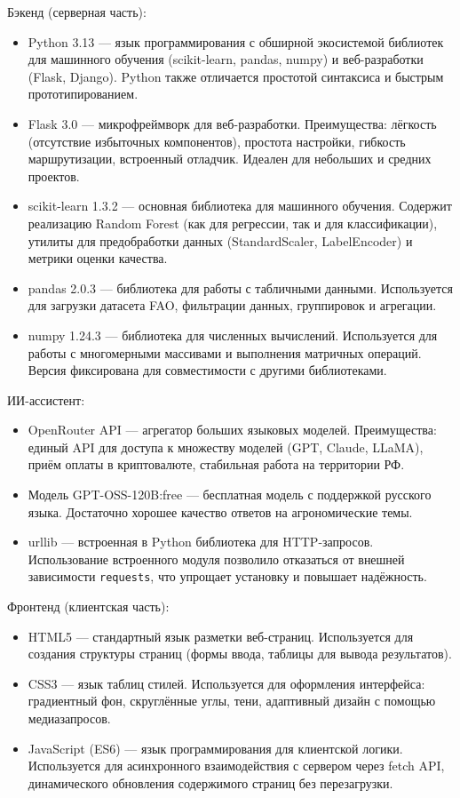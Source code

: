 \documentclass[14pt, a4paper]{extarticle}
\begin{document}
    Бэкенд (серверная часть):
    \begin{itemize}
        \item Python 3.13 — язык программирования с обширной экосистемой библиотек для машинного обучения (scikit-learn, pandas, numpy) и веб-разработки (Flask, Django). Python также отличается простотой синтаксиса и быстрым прототипированием.
        \item Flask 3.0 \cite{flask} — микрофреймворк для веб-разработки. Преимущества: лёгкость (отсутствие избыточных компонентов), простота настройки, гибкость маршрутизации, встроенный отладчик. Идеален для небольших и средних проектов.
        \item scikit-learn 1.3.2 \cite{sklearn} — основная библиотека для машинного обучения. Содержит реализацию Random Forest (как для регрессии, так и для классификации), утилиты для предобработки данных (StandardScaler, LabelEncoder) и метрики оценки качества.
        \item pandas 2.0.3 — библиотека для работы с табличными данными. Используется для загрузки датасета FAO, фильтрации данных, группировок и агрегации.
        \item numpy 1.24.3 — библиотека для численных вычислений. Используется для работы с многомерными массивами и выполнения матричных операций. Версия фиксирована для совместимости с другими библиотеками.
    \end{itemize}

    ИИ-ассистент:
    \begin{itemize}
        \item OpenRouter API \cite{openrouter} — агрегатор больших языковых моделей. Преимущества: единый API для доступа к множеству моделей (GPT, Claude, LLaMA), приём оплаты в криптовалюте, стабильная работа на территории РФ.
        \item Модель GPT-OSS-120B:free — бесплатная модель с поддержкой русского языка. Достаточно хорошее качество ответов на агрономические темы.
        \item urllib — встроенная в Python библиотека для HTTP-запросов. Использование встроенного модуля позволило отказаться от внешней зависимости \texttt{requests}, что упрощает установку и повышает надёжность.
    \end{itemize}

    Фронтенд (клиентская часть):
    \begin{itemize}
        \item HTML5 — стандартный язык разметки веб-страниц. Используется для создания структуры страниц (формы ввода, таблицы для вывода результатов).
        \item CSS3 — язык таблиц стилей. Используется для оформления интерфейса: градиентный фон, скруглённые углы, тени, адаптивный дизайн с помощью медиазапросов.
        \item JavaScript (ES6) — язык программирования для клиентской логики. Используется для асинхронного взаимодействия с сервером через fetch API, динамического обновления содержимого страниц без перезагрузки.
    \end{itemize}
\end{document}
